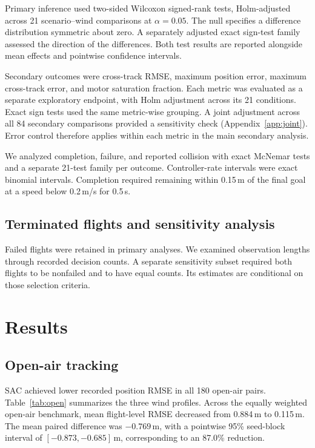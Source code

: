 \documentclass[11pt,a4paper]{article}
\begin{document}
Primary inference used two-sided Wilcoxon signed-rank tests\cite{wilcoxon}, Holm-adjusted across 21 scenario--wind comparisons at $\alpha=0.05$\cite{holm}. The null specifies a difference distribution symmetric about zero. A separately adjusted exact sign-test family assessed the direction of the differences\cite{binomial}. Both test results are reported alongside mean effects and pointwise confidence intervals.

Secondary outcomes were cross-track RMSE, maximum position error, maximum cross-track error, and motor saturation fraction. Each metric was evaluated as a separate exploratory endpoint, with Holm adjustment across its 21 conditions. Exact sign tests used the same metric-wise grouping. A joint adjustment across all 84 secondary comparisons provided a sensitivity check (Appendix~\ref{app:joint}). Error control therefore applies within each metric in the main secondary analysis.

We analyzed completion, failure, and reported collision with exact McNemar tests and a separate 21-test family per outcome\cite{mcnemar}. Controller-rate intervals were exact binomial intervals. Completion required remaining within 0.15\,m of the final goal at a speed below 0.2\,m/s for 0.5\,s.

\subsection{Terminated flights and sensitivity analysis}
Failed flights were retained in primary analyses. We examined observation lengths through recorded decision counts. A separate sensitivity subset required both flights to be nonfailed and to have equal counts. Its estimates are conditional on those selection criteria.

\section{Results}
\subsection{Open-air tracking}
SAC achieved lower recorded position RMSE in all 180 open-air pairs. Table~\ref{tab:open} summarizes the three wind profiles. Across the equally weighted open-air benchmark, mean flight-level RMSE decreased from 0.884\,m to 0.115\,m. The mean paired difference was $-0.769$\,m, with a pointwise 95\% seed-block interval of $[-0.873,-0.685]$\,m, corresponding to an 87.0\% reduction.
\end{document}
